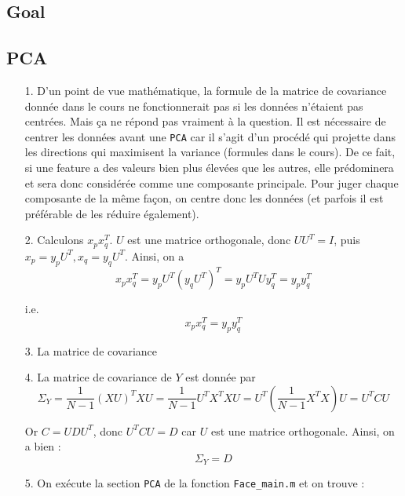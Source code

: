 \documentclass[a4paper, 11pt]{article}
\begin{document}
	\subsection{Goal}
	
	\subsection{PCA}
	
\begin{itemize}

	\item[1.] D'un point de vue mathématique, la formule de la matrice de covariance donnée dans le cours ne fonctionnerait pas si les données n'étaient pas centrées. Mais ça ne répond pas vraiment à la question. Il est nécessaire de centrer les données avant une \texttt{PCA} car il s'agit d'un procédé qui projette dans les directions qui maximisent la variance (formules dans le cours). De ce fait, si une feature a des valeurs bien plus élevées que les autres, elle prédominera et sera donc considérée comme une composante principale. Pour juger chaque composante de la même façon, on centre donc les données (et parfois il est préférable de les réduire également).

	\item[2.] Calculons $x_{p}x_{q}^{T}$. $U$ est une matrice orthogonale, donc $UU^{T} = I$, puis $x_{p} = y_{p}U^{T}, x_{q} = y_{q}U^{T}$. Ainsi, on a \[ x_{p}x_{q}^{T} = y_{p}U^{T} \left( y_{q}U^{T} \right)^{T} = y_{p}U^{T}U y_{q}^{T} = y_{p} y_{q}^{T} \]

i.e. \[ \boxed{x_{p}x_{q}^{T} = y_{p} y_{q}^{T}} \]

	\item[3.] La matrice de covariance
	
	\item[4.] La matrice de covariance de $Y$ est donnée par \[ \Sigma_{Y} = \frac{1}{N-1}(XU)^{T}XU = \frac{1}{N-1} U^{T}X^{T}XU = U^{T} \left( \frac{1}{N-1} X^{T}X \right) U = U^{T} C U \]
	
Or $C = UDU^{T}$, donc $U^{T}CU = D$ car $U$ est une matrice orthogonale. Ainsi, on a bien : \[ \boxed{\Sigma_{Y} = D} \]

	\item[5.] On exécute la section \texttt{PCA} de la fonction \texttt{Face\_main.m} et on trouve :
	

\end{itemize}
\end{document}
